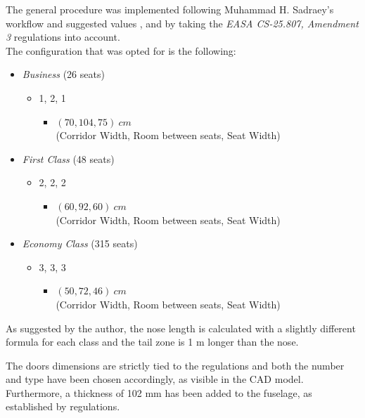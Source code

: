 \documentclass{article}
\begin{document}
The general procedure was implemented following Muhammad H. Sadraey's workflow and suggested values \autocite{Sadraey_Mohammad},
and by taking the \textit{EASA CS-25.807, Amendment 3} \autocite{EASA_CS25} regulations into account.\\ 

The configuration that was opted for is the following: 
\begin{itemize}
    \item \textit{Business} (26 seats)
        \begin{itemize}
            \item 1, 2, 1
            \begin{itemize}
                \item $\left ( 70, 104, 75 \right ) \ cm$ \\ (Corridor Width, Room between seats, Seat Width)
            \end{itemize}
        \end{itemize}
    \item \textit{First Class} (48 seats)
        \begin{itemize}
            \item 2, 2, 2
            \begin{itemize}
                \item $\left ( 60, 92, 60 \right ) \ cm$ \\ (Corridor Width, Room between seats, Seat Width)
            \end{itemize}
        \end{itemize}
    \item \textit{Economy Class} (315 seats)
        \begin{itemize}
            \item 3, 3, 3
            \begin{itemize}
                \item $\left ( 50, 72, 46 \right ) \ cm$ \\ (Corridor Width, Room between seats, Seat Width)
            \end{itemize}
        \end{itemize}
\end{itemize}
\clearpage

As suggested by the author, the nose length is calculated with a slightly different
formula for each class and the tail zone is 1 m longer than the nose. 

The doors dimensions are strictly tied to the regulations and both the number and type have been 
chosen accordingly, as visible in the CAD model. 
Furthermore, a thickness of 102 mm has been added to the fuselage, as established by regulations. 
\end{document}
